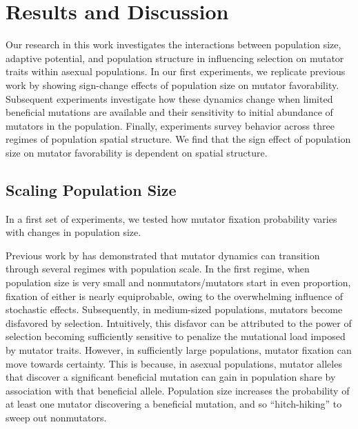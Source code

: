 \section{Results and Discussion} \label{sec:results}

Our research in this work investigates the interactions between population size, adaptive potential, and population structure in influencing selection on mutator traits within asexual populations.
In our first experiments, we replicate previous work by \citet{raynes2018sign} showing sign-change effects of population size on mutator favorability.
Subsequent experiments investigate how these dynamics change when limited beneficial mutations are available and their sensitivity to initial abundance of mutators in the population.
Finally, experiments survey behavior across three regimes of population spatial structure.
We find that the sign effect of population size on mutator favorability is dependent on spatial structure.

\subsection{Scaling Population Size}
\label{sec:scaling-population-size}

In a first set of experiments, we tested how mutator fixation probability varies with changes in population size.

Previous work by \citet{raynes2018sign} has demonstrated that mutator dynamics can transition through several regimes with population scale.
In the first regime, when population size is very small and nonmutators/mutators start in even proportion, fixation of either is nearly equiprobable, owing to the overwhelming influence of stochastic effects.
Subsequently, in medium-sized populations, mutators become disfavored by selection.
Intuitively, this disfavor can be attributed to the power of selection becoming sufficiently sensitive to penalize the mutational load imposed by mutator traits.
However, in sufficiently large populations, mutator fixation can move towards certainty.
This is because, in asexual populations, mutator alleles that discover a significant beneficial mutation can gain in population share by association with that beneficial allele.
Population size increases the probability of at least one mutator discovering a beneficial mutation, and so ``hitch-hiking'' to sweep out nonmutators.



